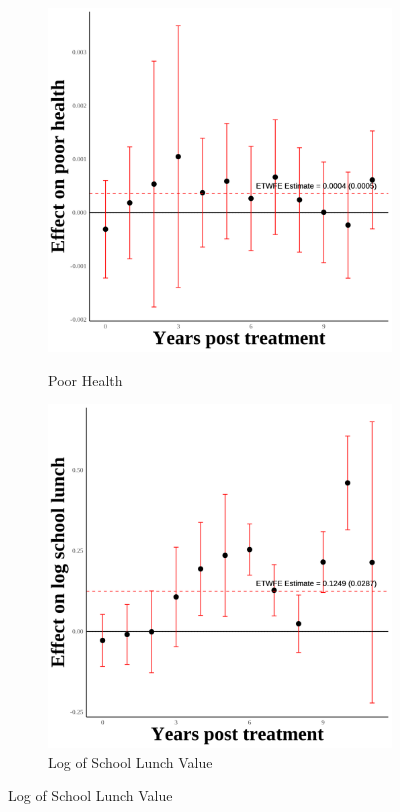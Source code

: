 \documentclass[12pt,english]{article}
\begin{document}
\pagebreak

\begin{figure}[H]
  \caption{Effect of Immigration Enforcement on Third Generation Outcomes}
  \centering

  \begin{subfigure}[b]{0.3\textwidth}
    \centering
    \caption{Poor Health}
    \includegraphics[width=\linewidth]{figures/plot49-poor_health_event_study-third.png}
    \label{fig:poor-health-third}
  \end{subfigure}
  \hfill
  \begin{subfigure}[b]{0.3\textwidth}
    \centering
    \caption{Log of School Lunch Value}
    \includegraphics[width=\linewidth]{figures/plot50-ln_schl_lunch_event_study-third.png}

\end{subfigure}
\end{figure}
\end{document}
